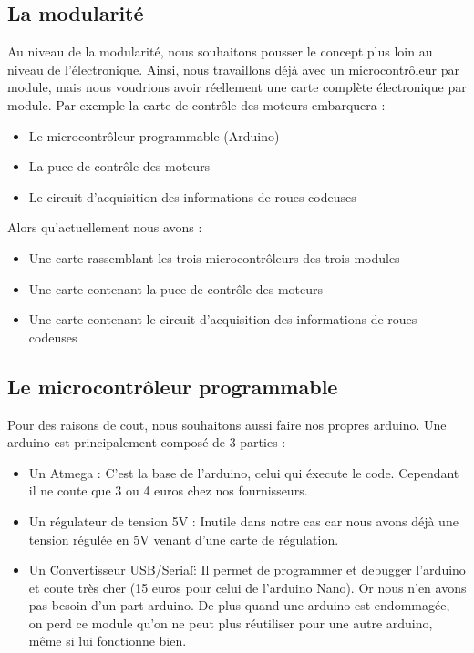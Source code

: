 \subsection{La modularité}
Au niveau de la modularité, nous souhaitons pousser le concept plus loin au niveau de l'électronique. Ainsi, nous travaillons déjà avec un microcontrôleur par module, mais nous voudrions avoir réellement une carte complète électronique par module. Par exemple la carte de contrôle des moteurs embarquera :
\begin{itemize}
	\item Le microcontrôleur programmable (Arduino)
	\item La puce de contrôle des moteurs
	\item Le circuit d'acquisition des informations de roues codeuses
\end{itemize}
Alors qu'actuellement nous avons :
\begin{itemize}
	\item Une carte rassemblant les trois microcontrôleurs des trois modules
	\item Une carte contenant la puce de contrôle des moteurs
	\item Une carte contenant le circuit d'acquisition des informations de roues codeuses
\end{itemize}

\subsection{Le microcontrôleur programmable}


Pour des raisons de cout, nous souhaitons aussi faire nos propres arduino. Une arduino est principalement composé de 3 parties :

\begin{itemize}
	\item Un Atmega : C'est la base de l'arduino, celui qui éxecute le code. Cependant il ne coute que 3 ou 4 euros chez nos fournisseurs.
	\item Un régulateur de tension 5V : Inutile dans notre cas car nous avons déjà une tension régulée en 5V venant d'une carte de régulation.
	\item Un \"Convertisseur USB/Serial\" : Il permet de programmer et debugger l'arduino et coute très cher (15 euros pour celui de l'arduino Nano). Or nous n'en avons pas besoin d'un part arduino. De plus quand une arduino est endommagée, on perd ce module qu'on ne peut plus réutiliser pour une autre arduino, même si lui fonctionne bien.
\end{itemize}

